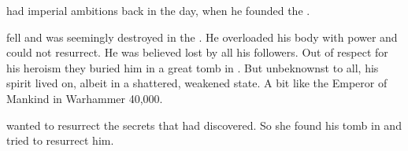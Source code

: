 \Sethicus had imperial ambitions back in the day, when he founded the \dragons.



\Sethicus fell and was seemingly destroyed in the \firstbanewar.
He overloaded his body with power and could not resurrect.
He was believed lost by all his followers.
Out of respect for his heroism they buried him in a great tomb in \Dathka. 
But unbeknownst to all, his spirit lived on, albeit in a shattered, weakened state.
A bit like the Emperor of Mankind in Warhammer 40,000.

\Xserasshana wanted to resurrect the secrets that \Sethicus had discovered.
So she found his tomb in \Dathka and tried to resurrect him.


